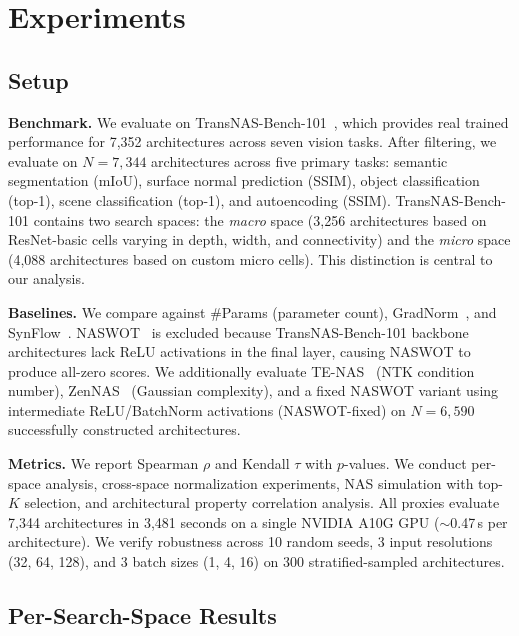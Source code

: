 \documentclass[10pt,twocolumn,letterpaper]{article}
\begin{document}
\section{Experiments}

\subsection{Setup}

\textbf{Benchmark.}
We evaluate on TransNAS-Bench-101~\cite{duan2021transnasbench101}, which provides real trained performance for 7{,}352 architectures across seven vision tasks.
After filtering, we evaluate on $N{=}7{,}344$ architectures across five primary tasks: semantic segmentation (mIoU), surface normal prediction (SSIM), object classification (top-1), scene classification (top-1), and autoencoding (SSIM).
TransNAS-Bench-101 contains two search spaces: the \emph{macro} space (3{,}256 architectures based on ResNet-basic cells varying in depth, width, and connectivity) and the \emph{micro} space (4{,}088 architectures based on custom micro cells).
This distinction is central to our analysis.

\textbf{Baselines.}
We compare against \#Params (parameter count), GradNorm~\cite{abdelfattah2021zerocost}, and SynFlow~\cite{tanaka2020synflow}.
NASWOT~\cite{mellor2021naswot} is excluded because TransNAS-Bench-101 backbone architectures lack ReLU activations in the final layer, causing NASWOT to produce all-zero scores.
We additionally evaluate TE-NAS~\cite{chen2021tenas} (NTK condition number), ZenNAS~\cite{lin2021zennas} (Gaussian complexity), and a fixed NASWOT variant using intermediate ReLU/BatchNorm activations (NASWOT-fixed) on $N{=}6{,}590$ successfully constructed architectures.

\textbf{Metrics.}
We report Spearman $\rho$ and Kendall $\tau$ with $p$-values.
We conduct per-space analysis, cross-space normalization experiments, NAS simulation with top-$K$ selection, and architectural property correlation analysis.
All proxies evaluate 7{,}344 architectures in 3{,}481 seconds on a single NVIDIA A10G GPU (${\sim}$0.47\,s per architecture).
We verify robustness across 10 random seeds, 3 input resolutions (32, 64, 128), and 3 batch sizes (1, 4, 16) on 300 stratified-sampled architectures.

\subsection{Per-Search-Space Results}
\label{sec:per_space}
\end{document}
